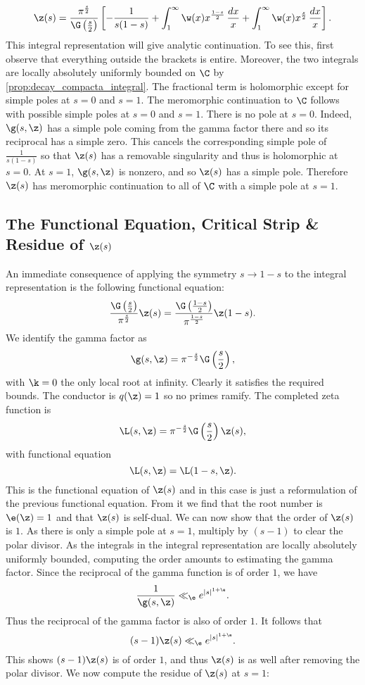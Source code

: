       \[
        \z(s) = \frac{\pi^{\frac{s}{2}}}{\G\left(\frac{s}{2}\right)}\left[-\frac{1}{s(1-s)}+\int_{1}^{\infty}\w(x)x^{\frac{1-s}{2}}\,\frac{dx}{x}+\int_{1}^{\infty}\w(x)x^{\frac{s}{2}}\,\frac{dx}{x}\right].
      \]
      This integral representation will give analytic continuation. To see this, first observe that everything outside the brackets is entire. Moreover, the two integrals are locally absolutely uniformly bounded on $\C$ by \cref{prop:decay_compacta_integral}. The fractional term is holomorphic except for simple poles at $s = 0$ and $s = 1$. The meromorphic continuation to $\C$ follows with possible simple poles at $s = 0$ and $s = 1$. There is no pole at $s = 0$. Indeed, $\g(s,\z)$ has a simple pole coming from the gamma factor there and so its reciprocal has a simple zero. This cancels the corresponding simple pole of $\frac{1}{s(1-s)}$ so that $\z(s)$ has a removable singularity and thus is holomorphic at $s = 0$. At $s = 1$, $\g(s,\z)$ is nonzero, and so $\z(s)$ has a simple pole. Therefore $\z(s)$ has meromorphic continuation to all of $\C$ with a simple pole at $s = 1$. 
    \subsection*{The Functional Equation, Critical Strip \& Residue of \texorpdfstring{$\z(s)$}{\z(s)}}
      An immediate consequence of applying the symmetry $s \to 1-s$ to the integral representation is the following functional equation:
      \[
        \frac{\G\left(\frac{s}{2}\right)}{\pi^{\frac{s}{2}}}\z(s) = \frac{\G\left(\frac{1-s}{2}\right)}{\pi^{\frac{1-s}{2}}}\z(1-s).
      \]
      We identify the gamma factor as
      \[
        \g(s,\z) = \pi^{-\frac{s}{2}}\G\left(\frac{s}{2}\right),
      \]
      with $\k = 0$ the only local root at infinity. Clearly it satisfies the required bounds. The conductor is $q(\z) = 1$ so no primes ramify. The completed zeta function is
      \[
        \L(s,\z) = \pi^{-\frac{s}{2}}\G\left(\frac{s}{2}\right)\z(s),
      \]
      with functional equation
      \[
        \L(s,\z) = \L(1-s,\z).
      \]
      This is the functional equation of $\z(s)$ and in this case is just a reformulation of the previous functional equation. From it we find that the root number is $\e(\z) = 1$ and that $\z(s)$ is self-dual. We can now show that the order of $\z(s)$ is $1$. As there is only a simple pole at $s = 1$, multiply by $(s-1)$ to clear the polar divisor. As the integrals in the integral representation are locally absolutely uniformly bounded, computing the order amounts to estimating the gamma factor. Since the reciprocal of the gamma function is of order $1$, we have
      \[
        \frac{1}{\g(s,\z)} \ll_{\e} e^{|s|^{1+\e}}.
      \]
      Thus the reciprocal of the gamma factor is also of order $1$. It follows that
      \[
        (s-1)\z(s) \ll_{\e} e^{|s|^{1+\e}}.
      \]
      This shows $(s-1)\z(s)$ is of order $1$, and thus $\z(s)$ is as well after removing the polar divisor. We now compute the residue of $\z(s)$ at $s = 1$:

